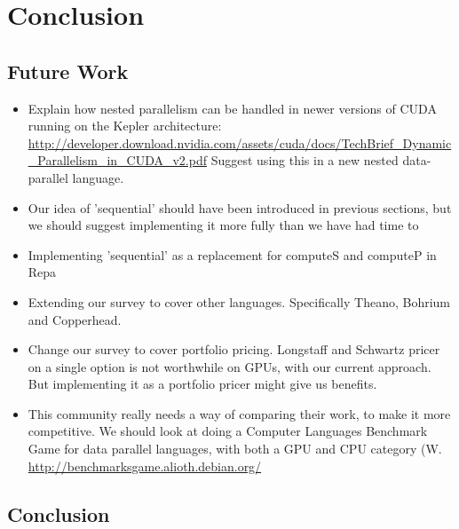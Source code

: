 

\chapter{Conclusion}
\section{Future Work}

\begin{itemize}
\item Explain how nested parallelism can be handled in newer versions
  of CUDA running on the Kepler architecture:
  \url{http://developer.download.nvidia.com/assets/cuda/docs/TechBrief_Dynamic_Parallelism_in_CUDA_v2.pdf}
  Suggest using this in a new nested data-parallel language.

\item Our idea of 'sequential' should have been introduced in previous
  sections, but we should suggest implementing it more fully than we
  have had time to

\item Implementing 'sequential' as a replacement for computeS and
  computeP in Repa

\item Extending our survey to cover other languages. Specifically
  Theano, Bohrium and Copperhead.

\item Change our survey to cover portfolio pricing. Longstaff and
  Schwartz pricer on a single option is not worthwhile on GPUs, with
  our current approach. But implementing it as a portfolio pricer
  might give us benefits.

\item This community really needs a way of comparing their work, to
  make it more competitive. We should look at doing a Computer
  Languages Benchmark Game for data parallel languages, with both a
  GPU and CPU category (W. \url{http://benchmarksgame.alioth.debian.org/}
\end{itemize}

\section{Conclusion}


